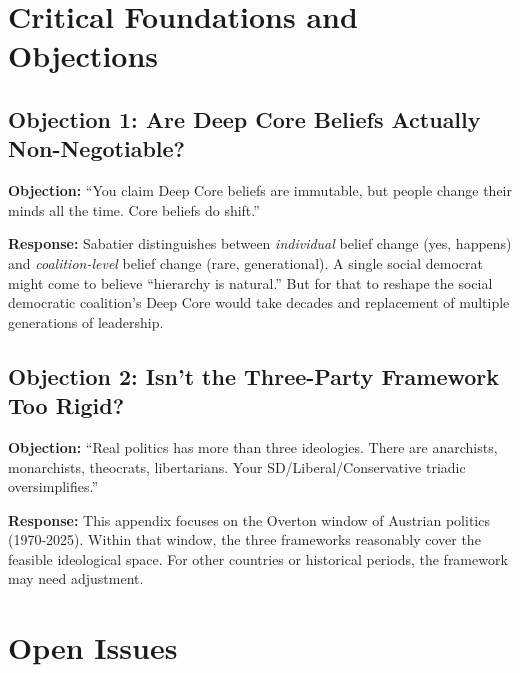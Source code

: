 
\section{Critical Foundations and Objections}
\label{sec:ck-foundations}

\subsection{Objection 1: Are Deep Core Beliefs Actually Non-Negotiable?}

\textbf{Objection:} ``You claim Deep Core beliefs are immutable, but people change their minds all the time. Core beliefs do shift.''

\textbf{Response:} Sabatier distinguishes between \textit{individual} belief change (yes, happens) and \textit{coalition-level} belief change (rare, generational). A single social democrat might come to believe ``hierarchy is natural.'' But for that to reshape the social democratic coalition's Deep Core would take decades and replacement of multiple generations of leadership.

\subsection{Objection 2: Isn't the Three-Party Framework Too Rigid?}

\textbf{Objection:} ``Real politics has more than three ideologies. There are anarchists, monarchists, theocrats, libertarians. Your SD/Liberal/Conservative triadic oversimplifies.''

\textbf{Response:} This appendix focuses on the Overton window of Austrian politics (1970-2025). Within that window, the three frameworks reasonably cover the feasible ideological space. For other countries or historical periods, the framework may need adjustment.


\section{Open Issues}
\label{sec:ck-open}

